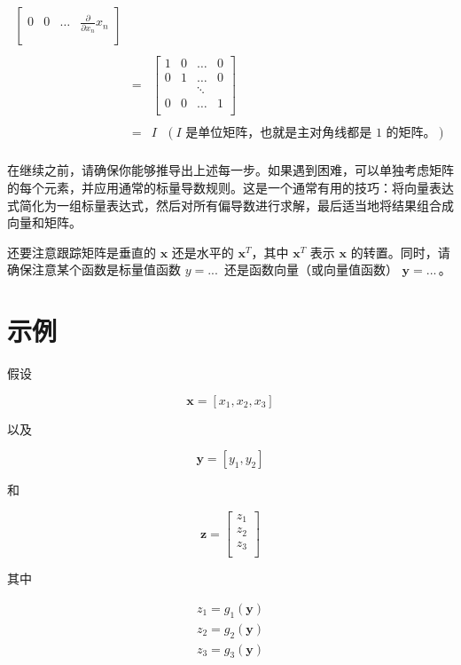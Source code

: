 \documentclass[lang=cn,newtx,10pt,scheme=chinese]{elegantbook}
\begin{document}
\begin{center}
\begin{eqnarray*}
\begin{bmatrix}
	0 & 0 &\ldots& \frac{\partial}{\partial {x_n}} x_n \\
	\end{bmatrix}\\\\
	 & = & \begin{bmatrix}
	1 & 0 & \ldots& 0 \\
	0 &1 &\ldots & 0 \\
	& & \ddots\\
	0 & 0 & \ldots &1 \\
	\end{bmatrix}\\\\
	& = & I ~~~(I \text{ 是单位矩阵，也就是主对角线都是 1 的矩阵。})\\
	\end{eqnarray*}

\end{center}

在继续之前，请确保你能够推导出上述每一步。如果遇到困难，可以单独考虑矩阵的每个元素，并应用通常的标量导数规则。这是一个通常有用的技巧：将向量表达式简化为一组标量表达式，然后对所有偏导数进行求解，最后适当地将结果组合成向量和矩阵。

还要注意跟踪矩阵是垂直的 $\mathbf{x}$ 还是水平的 $\mathbf{x}^T$，其中 $\mathbf{x}^T$ 表示 $\mathbf{x}$ 的转置。同时，请确保注意某个函数是标量值函数 $y = ...\,$ 还是函数向量（或向量值函数） $\mathbf{y} = ...\,$。

\section{示例}

假设

\[\mathbf{x} = [x_1, x_2, x_3]\]

以及

\[\mathbf{y} = [y_1, y_2]\]

和

\[\mathbf{z} = \begin{bmatrix}
           z_1\\
           z_2\\
           z_3\\
           \end{bmatrix}\]

其中

\begin{equation*}
\begin{matrix}
z_1 = g_1(\mathbf{y}) \\
z_2 = g_2(\mathbf{y}) \\
z_3 = g_3(\mathbf{y}) \\
\end{matrix}
\end{equation*}
\end{document}
